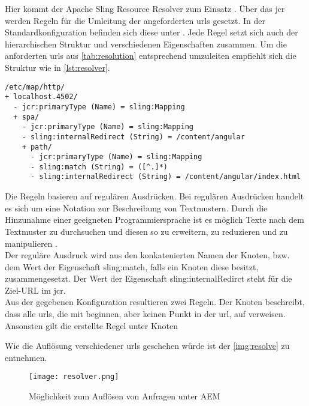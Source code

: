 Hier kommt der Apache Sling Resource Resolver zum Einsatz \cite{Foundation2016}. Über das \ac{jcr} werden Regeln für die Umleitung der angeforderten \ac{url}s gesetzt. In der Standardkonfiguration befinden sich diese unter . Jede Regel setzt sich auch der hierarchischen Struktur und verschiedenen Eigenschaften zusammen. Um die anforderten \ac{url}s aus \autoref{tab:resolution} entsprechend umzuleiten empfiehlt sich die Struktur wie in \autoref{lst:resolver}.

\begin{lstlisting}[style=jcr,caption=Konfigurationsbeispiel für den Apache Sling Resource Resolver, label=lst:resolver]
/etc/map/http/
+ localhost.4502/
  - jcr:primaryType (Name) = sling:Mapping
  + spa/
    - jcr:primaryType (Name) = sling:Mapping
    - sling:internalRedirect (String) = /content/angular
    + path/
      - jcr:primaryType (Name) = sling:Mapping
      - sling:match (String) = ([^.]*)
      - sling:internalRedirect (String) = /content/angular/index.html
\end{lstlisting}

Die Regeln basieren auf regulären Ausdrücken. Bei regulären Ausdrücken handelt es sich um eine Notation zur Beschreibung von Textmustern. Durch die Hinzunahme einer geeigneten Programmiersprache ist es möglich Texte nach dem Textmuster zu durchsuchen und diesen so zu erweitern, zu reduzieren und zu manipulieren \cite[S. 1 f.]{Friedl2009}. \\
Der reguläre Ausdruck wird aus den konkatenierten Namen der Knoten, bzw. dem Wert der Eigenschaft sling:match, falls ein Knoten diese besitzt, zusammengesetzt. Der Wert der Eigenschaft sling:internalRedirct steht für die Ziel-URL im \ac{jcr}. \\
Aus der gegebenen Konfiguration resultieren zwei Regeln. Der Knoten  beschreibt, dass alle \ac{url}s, die mit  beginnen, aber keinen Punkt in der \ac{url}, auf  verweisen. Ansonsten gilt die erstellte Regel unter Knoten 

Wie die Auflösung verschiedener \ac{url}s geschehen würde ist der \autoref{img:resolve} zu entnehmen.

\begin{figure}[H]
	\begin{center}
		\texttt{[image: resolver.png]}
		\caption{Möglichkeit zum Auflösen von Anfragen unter AEM}
		\label{img:resolve}
	\end{center}
\end{figure}


%	




